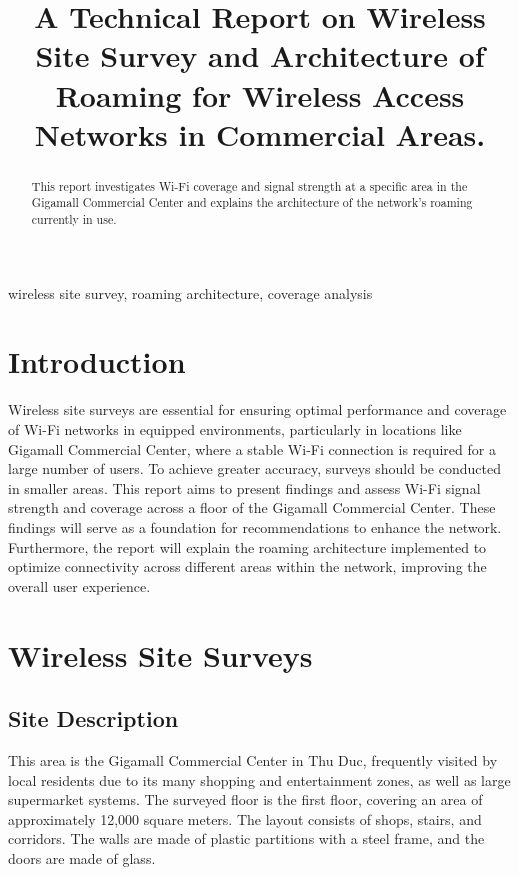 \documentclass[conference]{IEEEtran}
\title{A Technical Report on Wireless Site Survey and Architecture of Roaming for Wireless Access Networks in Commercial Areas.}
\author{
    \IEEEauthorblockN{Nguyen Duc Chi Dat}
    \IEEEauthorblockA{
        \textit{Faculty of Information Security,} \\
        \textit{University of Information Technology}\\ 
        Ho Chi Minh City, Viet Nam \\
        datndc.19@grad.uit.edu.vn
    }
}
\begin{document}
\maketitle

\begin{abstract}
This report investigates Wi-Fi coverage and signal strength at a specific area in the Gigamall Commercial Center and explains the architecture of the network's roaming currently in use.
\end{abstract}

\begin{IEEEkeywords}
wireless site survey, roaming architecture, coverage analysis
\end{IEEEkeywords}

\section{Introduction}
Wireless site surveys are essential for ensuring optimal performance and coverage of Wi-Fi networks in equipped environments, particularly in locations like Gigamall Commercial Center, where a stable Wi-Fi connection is required for a large number of users. To achieve greater accuracy, surveys should be conducted in smaller areas. This report aims to present findings and assess Wi-Fi signal strength and coverage across a floor of the Gigamall Commercial Center. These findings will serve as a foundation for recommendations to enhance the network. Furthermore, the report will explain the roaming architecture implemented to optimize connectivity across different areas within the network, improving the overall user experience.

\section{Wireless Site Surveys}

\subsection{Site Description}
This area is the Gigamall Commercial Center in Thu Duc, frequently visited by local residents due to its many shopping and entertainment zones, as well as large supermarket systems. The surveyed floor is the first floor, covering an area of approximately 12,000 square meters. The layout consists of shops, stairs, and corridors. The walls are made of plastic partitions with a steel frame, and the doors are made of glass.
\end{document}
